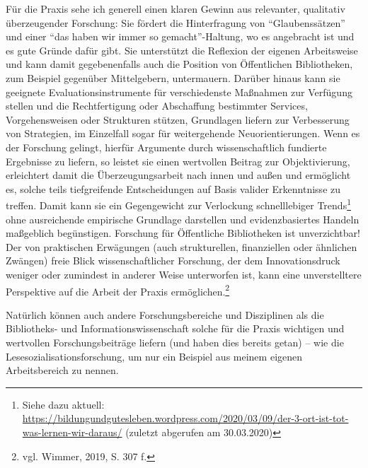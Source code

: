 \documentclass[a4paper,
fontsize=11pt,
oneside,
numbers=noperiodatend,
parskip=half-,
bibliography=totoc,
final
]{scrartcl}
\begin{document}
Für die Praxis sehe ich generell einen klaren Gewinn aus relevanter,
qualitativ überzeugender Forschung: Sie fördert die Hinterfragung von
\enquote{Glaubenssätzen} und einer \enquote{das haben wir immer so
gemacht}-Haltung, wo es angebracht ist und es gute Gründe dafür gibt.
Sie unterstützt die Reflexion der eigenen Arbeitsweise und kann damit
gegebenenfalls auch die Position von Öffentlichen Bibliotheken, zum
Beispiel gegenüber Mittelgebern, untermauern. Darüber hinaus kann sie
geeignete Evaluationsinstrumente für verschiedenste Maßnahmen zur
Verfügung stellen und die Rechtfertigung oder Abschaffung bestimmter
Services, Vorgehensweisen oder Strukturen stützen, Grundlagen liefern
zur Verbesserung von Strategien, im Einzelfall sogar für weitergehende
Neuorientierungen. Wenn es der Forschung gelingt, hierfür Argumente
durch wissenschaftlich fundierte Ergebnisse zu liefern, so leistet sie
einen wertvollen Beitrag zur Objektivierung, erleichtert damit die
Überzeugungsarbeit nach innen und außen und ermöglicht es, solche teils
tiefgreifende Entscheidungen auf Basis valider Erkenntnisse zu treffen.
Damit kann sie ein Gegengewicht zur Verlockung schnelllebiger
Trends\footnote{Siehe dazu aktuell:
  \url{https://bildungundgutesleben.wordpress.com/2020/03/09/der-3-ort-ist-tot-was-lernen-wir-daraus/}
  (zuletzt abgerufen am 30.03.2020)} ohne ausreichende empirische
Grundlage darstellen und evidenzbasiertes Handeln maßgeblich
begünstigen. Forschung für Öffentliche Bibliotheken ist unverzichtbar!
Der von praktischen Erwägungen (auch strukturellen, finanziellen oder
ähnlichen Zwängen) freie Blick wissenschaftlicher Forschung, der dem
Innovationsdruck weniger oder zumindest in anderer Weise unterworfen
ist, kann eine unverstelltere Perspektive auf die Arbeit der Praxis
ermöglichen.\footnote{vgl. Wimmer, 2019, S. 307 f.}

Natürlich können auch andere Forschungsbereiche und Disziplinen als die
Bibliotheks- und Informationswissenschaft solche für die Praxis
wichtigen und wertvollen Forschungsbeiträge liefern (und haben dies
bereits getan) -- wie die Lesesozialisationsforschung, um nur ein
Beispiel aus meinem eigenen Arbeitsbereich zu nennen.
\end{document}
